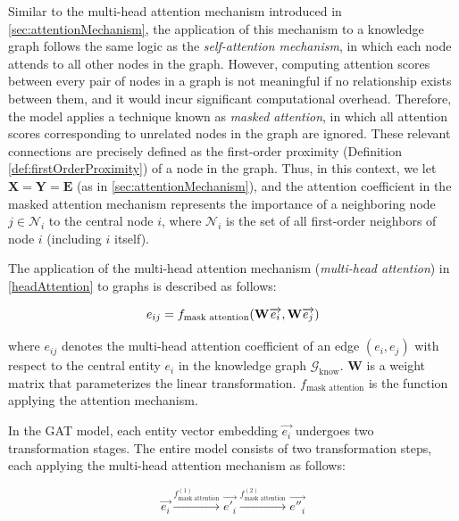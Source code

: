 Similar to the multi-head attention mechanism introduced in \ref{sec:attentionMechanism}, the application of this mechanism to a knowledge graph follows the same logic as the \textit{self-attention mechanism}, in which each node attends to all other nodes in the graph. However, computing attention scores between every pair of nodes in a graph is not meaningful if no relationship exists between them, and it would incur significant computational overhead. Therefore, the model applies a technique known as \textit{masked attention}, in which all attention scores corresponding to unrelated nodes in the graph are ignored. These relevant connections are precisely defined as the first-order proximity (Definition \ref{def:firstOrderProximity}) of a node in the graph. Thus, in this context, we let $\mathbf{X} = \mathbf{Y} = \mathbf{E}$ (as in \ref{sec:attentionMechanism}), and the attention coefficient in the masked attention mechanism represents the importance of a neighboring node $j \in \mathcal{N}_{i}$ to the central node $i$, where $\mathcal{N}_{i}$ is the set of all first-order neighbors of node $i$ (including $i$ itself).




The application of the multi-head attention mechanism (\textit{multi-head attention}) in \ref{headAttention} to graphs is described as follows:

\begin{equation}
	\label{maskAttention}
	\centering
	{e_{ij}}={f_{\text{mask attention}}(\mathbf{W} \overrightarrow{e_i}, \mathbf{W} \overrightarrow{e_j})}
\end{equation}

where $e_{ij}$ denotes the multi-head attention coefficient of an edge $(e_i, e_j)$ with respect to the central entity $e_i$ in the knowledge graph $\mathcal{G}_{\text{know}}$. $\mathbf{W}$ is a weight matrix that parameterizes the linear transformation. $f_{\text{mask attention}}$ is the function applying the attention mechanism.

In the GAT model, each entity vector embedding $\overrightarrow{e_i}$ undergoes two transformation stages. The entire model consists of two transformation steps, each applying the multi-head attention mechanism as follows:

\begin{equation}
	\label{gatProcess}
	\overrightarrow{e_i} \xrightarrow{f_{\text{mask attention}}^{(1)}} \overrightarrow{e'_i} \xrightarrow{f_{\text{mask attention}}^{(2)}} \overrightarrow{e''_i}
\end{equation}

